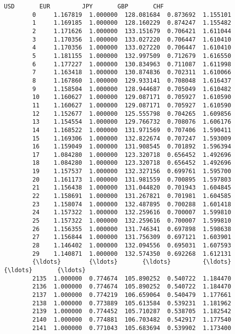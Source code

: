 \documentclass[11pt]{article}
\begin{document}
\begin{Verbatim}[commandchars=\\\{\}]
                   USD       EUR         JPY       GBP       CHF  
        0     1.167819  1.000000  128.081684  0.873692  1.155101  
        1     1.169185  1.000000  128.160229  0.874247  1.155482  
        2     1.171626  1.000000  133.151679  0.706421  1.611044  
        3     1.170356  1.000000  133.027220  0.706447  1.610410  
        4     1.170356  1.000000  133.027220  0.706447  1.610410  
        5     1.181155  1.000000  132.997509  0.712679  1.616550  
        6     1.177227  1.000000  130.834963  0.711087  1.611998  
        7     1.163418  1.000000  130.874836  0.702311  1.610066  
        8     1.167860  1.000000  129.933141  0.708048  1.616437  
        9     1.158504  1.000000  128.944687  0.705049  1.610482  
        10    1.160627  1.000000  129.087171  0.705927  1.610590  
        11    1.160627  1.000000  129.087171  0.705927  1.610590  
        12    1.152677  1.000000  125.555798  0.704265  1.609856  
        13    1.154554  1.000000  129.766732  0.708076  1.606176  
        14    1.168522  1.000000  131.971569  0.707406  1.590411  
        15    1.169306  1.000000  132.822674  0.707247  1.593009  
        16    1.159049  1.000000  131.908545  0.701892  1.596394  
        17    1.084280  1.000000  123.320718  0.656452  1.492696  
        18    1.084280  1.000000  123.320718  0.656452  1.492696  
        19    1.157537  1.000000  132.327156  0.699761  1.595700  
        20    1.161173  1.000000  131.981559  0.700895  1.597803  
        21    1.156438  1.000000  131.044820  0.701943  1.604845  
        22    1.158691  1.000000  131.267821  0.701981  1.604585  
        23    1.158074  1.000000  132.487895  0.700288  1.601418  
        24    1.157322  1.000000  132.259616  0.700007  1.599810  
        25    1.157322  1.000000  132.259616  0.700007  1.599810  
        26    1.156355  1.000000  131.746341  0.697898  1.598638  
        27    1.156844  1.000000  131.756309  0.697121  1.603901  
        28    1.146402  1.000000  132.094556  0.695031  1.607593  
        29    1.140871  1.000000  132.574350  0.692268  1.612131  
        {\ldots}        {\ldots}       {\ldots}         {\ldots}       {\ldots}       {\ldots}  
        2135  1.000000  0.774674  105.890252  0.540722  1.184470  
        2136  1.000000  0.774674  105.890252  0.540722  1.184470  
        2137  1.000000  0.774219  106.659064  0.540479  1.177661  
        2138  1.000000  0.773889  105.613584  0.539231  1.181962  
        2139  1.000000  0.774452  105.710287  0.538705  1.182542  
        2140  1.000000  0.774881  106.703482  0.542917  1.177540  
        2141  1.000000  0.771043  105.683694  0.539902  1.173400  

\end{Verbatim}
\end{document}

